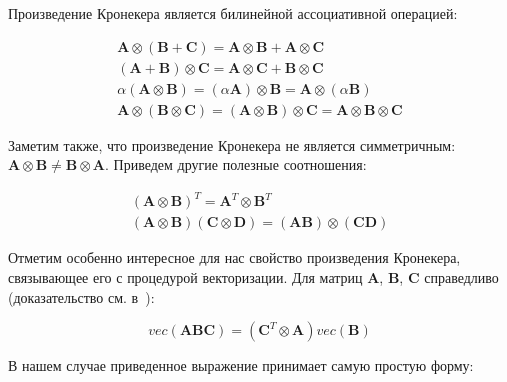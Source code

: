 Произведение Кронекера является билинейной ассоциативной операцией:

\begin{gather}
     \mathbf{A} \otimes (\mathbf{B} + \mathbf{C}) = \mathbf{A} \otimes \mathbf{B} + \mathbf{A} \otimes \mathbf{C} \\
    (\mathbf{A} + \mathbf{B}) \otimes \mathbf{C} = \mathbf{A} \otimes \mathbf{C} + \mathbf{B} \otimes \mathbf{C} \\
    \alpha(\mathbf{A} \otimes \mathbf{B}) = (\alpha\mathbf{A}) \otimes \mathbf{B} = \mathbf{A} \otimes (\alpha\mathbf{B}) \\
    \mathbf{A} \otimes(\mathbf{B} \otimes \mathbf{C}) =
   (\mathbf{A} \otimes \mathbf{B})\otimes \mathbf{C} =
    \mathbf{A} \otimes \mathbf{B} \otimes \mathbf{C}
\end{gather}

Заметим также, что произведение Кронекера не является симметричным: $\mathbf{A} \otimes \mathbf{B} \neq \mathbf{B} \otimes \mathbf{A}$.
Приведем другие полезные соотношения:

\begin{gather}
    (\mathbf{A} \otimes \mathbf{B})^T = \mathbf{A}^T \otimes \mathbf{B}^T \\
    (\mathbf{A} \otimes \mathbf{B}) (\mathbf{C} \otimes \mathbf{D}) = (\mathbf{A} \mathbf{B}) \otimes (\mathbf{C} \mathbf{D})
\end{gather}

Отметим особенно интересное для нас свойство произведения Кронекера,
связывающее его с процедурой векторизации.  Для матриц $\mathbf{A}$,
$\mathbf{B}$, $\mathbf{C}$ справедливо (доказательство см. в~\cite{neudecker}):

\begin{equation}
    vec(\mathbf{A} \mathbf{B} \mathbf{C}) = (\mathbf{C}^T \otimes \mathbf{A}) vec(\mathbf{B})
    \label{eq:kron_vec}
\end{equation}

В нашем случае приведенное выражение принимает самую простую форму:

